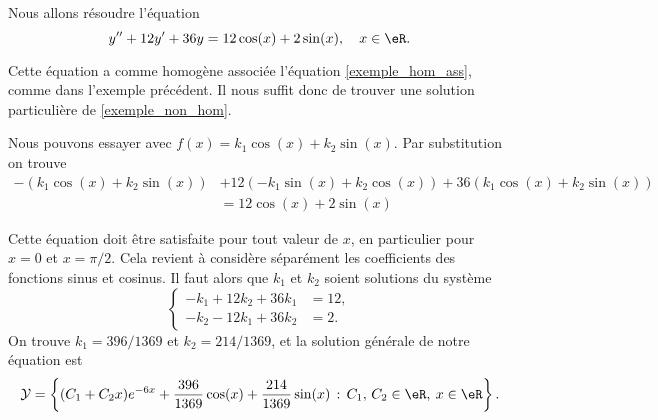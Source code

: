 \begin{example}
  Nous allons résoudre l'équation 
  \begin{equation}
    y'' + 12y' + 36 y = 12\cos(x) + 2\sin(x), \quad x\in\eR. 
  \end{equation}

Cette équation a comme homogène associée l'équation \eqref{exemple_hom_ass}, comme dans l'exemple précédent. Il nous suffit donc de trouver une solution particulière de \eqref{exemple_non_hom}.

Nous pouvons essayer avec $f(x)= k_1\cos(x) + k_2\sin(x)$. Par substitution on trouve
\begin{equation*}
  \begin{aligned}
    -\left(k_1\cos(x) + k_2\sin(x)\right) & +12 \left(-k_1\sin(x) + k_2\cos(x)\right) + 36\left(k_1\cos(x) + k_2\sin(x)\right)\\
    &= 12\cos(x) + 2\sin(x) 
  \end{aligned}
\end{equation*}

Cette équation doit \^etre satisfaite pour tout valeur de $x$, en particulier pour $x= 0$ et $x = \pi/2$. Cela revient à considère séparément les coefficients des fonctions sinus et cosinus. Il faut alors que $k_1$ et $k_2$ soient solutions du système 
\begin{equation*}
  \begin{cases}
    -k_1 + 12 k_2 + 36 k_1& = 12, \\
    -k_2 - 12 k_1 + 36 k_2& = 2.
  \end{cases}
\end{equation*}
On trouve $k_1= 396/1369$ et $k_2 = 214/1369$, et la solution générale de notre équation est 
\begin{equation*}
   \mathcal{Y}  = \left\{(C_1  +C_2x) e^{-6 x} +\frac{396}{1369}\cos(x) + \frac{214}{1369}\sin(x) \,:\, C_1,\, C_2 \in \eR, \: x\in \eR\right\}.
\end{equation*}
\end{example}

